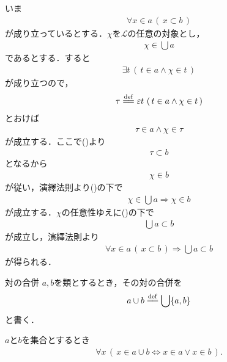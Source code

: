 	\begin{sketch}
		いま
		\begin{align}
			\forall x \in a\, (\, x \subset b\, )
			\label{fom:thm_union_of_subsets_is_subclass_1}
		\end{align}
		が成り立っているとする．$\chi$を$\mathcal{L}$の任意の対象とし，
		\begin{align}
			\chi \in \bigcup a
		\end{align}
		であるとする．すると
		\begin{align}
			\exists t\, \left(\, t \in a \wedge \chi \in t\, \right)
		\end{align}
		が成り立つので，
		\begin{align}
			\tau \defeq \varepsilon t\, \left(\, t \in a \wedge \chi \in t\, \right)
		\end{align}
		とおけば
		\begin{align}
			\tau \in a \wedge \chi \in \tau
		\end{align}
		が成立する．ここで()より
		\begin{align}
			\tau \subset b
		\end{align}
		となるから
		\begin{align}
			\chi \in b
		\end{align}
		が従い，演繹法則より()の下で
		\begin{align}
			\chi \in \bigcup a \Longrightarrow \chi \in b
		\end{align}
		が成立する．$\chi$の任意性ゆえに()の下で
		\begin{align}
			\bigcup a \subset b
		\end{align}
		が成立し，演繹法則より
		\begin{align}
			\forall x \in a\, (\, x \subset b\, ) \Longrightarrow \bigcup a \subset b
		\end{align}
		が得られる．
		\QED
	\end{sketch}
	
	\begin{itembox}[l]{対の合併}
		$a,b$を類とするとき，その対の合併を
		\begin{align}
			a \cup b \defeq \bigcup \{a,b\}
		\end{align}
		と書く．
	\end{itembox}
	
	\begin{screen}
		\begin{thm}[対の合併はそれぞれの要素を合わせたもの]\label{thm:union_of_pair_is_union_of_their_elements}
			$a$と$b$を集合とするとき
			\begin{align}
				\forall x\, (\, x \in a \cup b \Longleftrightarrow x \in a \vee x \in b\, ).
			\end{align}
		\end{thm}
	\end{screen}
	
